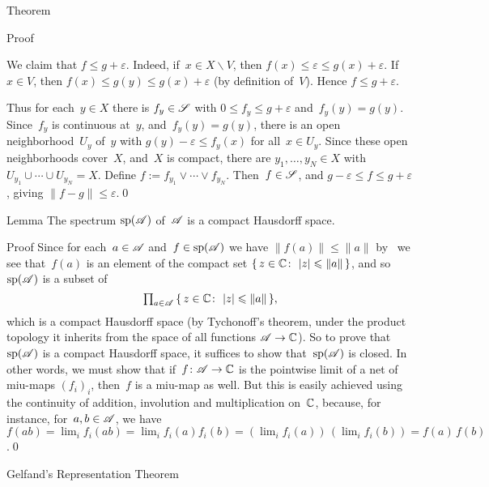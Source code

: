 \documentclass[a]{subfiles}
\begin{document}
\begin{parsec}
\begin{point}{Theorem}
\begin{point}{Proof}
\begin{point}
We claim that $f\leq g+\varepsilon$.
Indeed,
if~$x\in X\backslash V$,
then $f(x)\leq \varepsilon\leq g(x)+\varepsilon$.
If~$x\in V$,
then $f(x)\leq g(y)\leq g(x)+\varepsilon$
(by definition of~$V$).
Hence $f\leq g+\varepsilon$.
\end{point}
\begin{point}%
Thus for each~$y\in X$
there is $f_y\in \mathscr{S}$ with $0\leq f_y \leq g+\varepsilon$
and~$f_y(y)=g(y)$.
Since~$f_y$ is continuous at~$y$,
and~$f_y(y)=g(y)$,
there is an open neighborhood~$U_y$ of~$y$
with $g(y)-\varepsilon\leq f_y(x)$
for all~$x\in U_y$.
Since these open neighborhoods cover~$X$,
and~$X$ is compact,
there are $y_1,\dotsc,y_N\in X$
with $U_{y_1}\cup\dotsb\cup U_{y_N} = X$.
Define $f:=f_{y_1}\vee \dotsb\vee f_{y_N}$.
Then~$f\in\mathscr{S}$,
and $g-\varepsilon \leq f\leq g+\varepsilon$,
giving $\|f-g\|\leq \varepsilon$.\qed
\end{point}
\end{point}
\end{point}
\begin{point}{Lemma}%
The spectrum $\mathrm{sp}(\mathscr{A})$ of~$\mathscr{A}$ is a compact Hausdorff space.
\begin{point}{Proof}%
Since for each~$a\in \mathscr{A}$
and~$f\in \mathrm{sp}(\mathscr{A})$
we have  $\|f(a)\|\leq \|a\|$ 
by~
we see that~$f(a)$ is an element of the compact set
$\{\,z\in \mathbb{C}\colon\, \left|z\right|\leqslant\|a\|\,\}$,
and so~$\mathrm{sp}(\mathscr{A})$ is a subset of
\begin{equation*}
\textstyle
\prod_{a\in \mathscr{A}}\, \{\,z\in \mathbb{C}\colon\, \left|z\right|\leqslant \|a\|\,\},
\end{equation*}
which is a compact Hausdorff space
(by Tychonoff's theorem, under the product topology
it inherits
from the space of all functions $\mathscr{A}\to \mathbb{C}$).
So to prove that~$\mathrm{sp}(\mathscr{A})$
is a compact Hausdorff space,
it suffices to show that~$\mathrm{sp}(\mathscr{A})$
is closed.
In other words,
we must show that if~$f\colon \mathscr{A}\to \mathbb{C}$
is the pointwise limit of a net of miu-maps $(f_i)_i$,
then~$f$ is a miu-map as well.
But this is easily achieved
using the continuity of addition, involution and multiplication on~$\mathbb{C}$,
because, for instance, 
for~$a,b\in\mathscr{A}$, we have $f(ab)
= \lim_i f_i(ab)=\lim_i f_i(a)f_i(b)
 = (\lim_i f_i(a))\,(\lim_i f_i(b))
= f(a) \,f(b)$.\qed
\end{point}
\end{point}
\begin{point}[gelfand]{Gelfand's Representation Theorem}%
%

\end{point}
\end{parsec}
\end{document}
